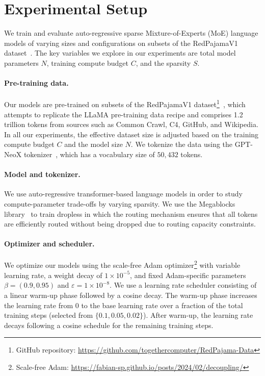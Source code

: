 \section{Experimental Setup}
\label{app:exp_setup}

We train and evaluate auto-regressive sparse Mixture-of-Experts (MoE) language models of varying sizes and configurations on subsets of the RedPajamaV1 dataset~\cite{together2023redpajama}. 
The key variables we explore in our experiments are total model parameters $N$, training compute budget $C$, and the \moe sparsity $S$.

\paragraph{Pre-training data.} 
Our models are pre-trained on subsets of the RedPajamaV1 dataset\footnote{GitHub repository: \url{https://github.com/togethercomputer/RedPajama-Data}}~\cite{together2023redpajama}, which attempts to  replicate the LLaMA pre-training data recipe and comprises 1.2 trillion tokens from sources such as Common Crawl, C4, GitHub, and Wikipedia. 
In all our experiments, the effective dataset size is adjusted based on the training compute budget $C$ and the model size $N$. We tokenize the data using the GPT-NeoX tokenizer~\cite{black2022gpt}, which has a vocabulary size of $50,432$ tokens.  

\paragraph{Model and tokenizer.} 
We use auto-regressive transformer-based \moe language models in order to study compute-parameter trade-offs by varying \moe sparsity. 
We use the Megablocks library~\cite{megablocks} to train dropless \moes in which the routing mechanism ensures that all tokens are efficiently routed without being dropped due to routing capacity constraints.

\paragraph{Optimizer and scheduler.} 
We optimize our models using the scale-free Adam optimizer\footnote{Scale-free Adam: \url{https://fabian-sp.github.io/posts/2024/02/decoupling/}} with variable learning rate, a weight decay of $1 \times 10^{-5}$, and fixed Adam-specific parameters $\beta=(0.9, 0.95)$ and $\varepsilon=1 \times 10^{-8}$. 
We use a learning rate scheduler consisting of a linear warm-up phase followed by a cosine decay. 
The warm-up phase increases the learning rate from $0$ to the base learning rate over a fraction of the total training steps (selected from $\{0.1, 0.05, 0.02\}$). 
After warm-up, the learning rate decays following a cosine schedule for the remaining training steps.

